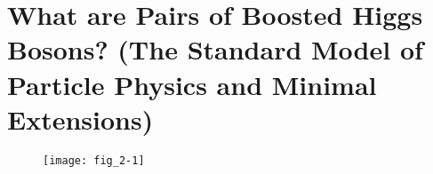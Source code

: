 \chapter{What are Pairs of Boosted Higgs Bosons? (The Standard Model of Particle Physics and Minimal Extensions)}
\label{chap:two}

\sect{\lipsum*[10][1]}

\subsect{\lipsum*[10][2]}

\lipsum[1-2]

\subsect{\lipsum*[10][3]}

\lipsum[3-5]

\subsect{\lipsum*[10][4]}

\lipsum[6-7]

\subsect{\lipsum*[10][5]}

\lipsum[9-10]

\subsect{\lipsum*[10][6]}

\lipsum[11-12]

\sect{\lipsum*[11][1]}

\subsect{\lipsum*[11][2]}

\lipsum[13]

\subsect{\lipsum*[11][3]}

\lipsum[13-15]

\subsect{\lipsum*[11][4]}

\lipsum[16-18]

\subsect{\lipsum*[11][5]}

\lipsum[19-20]

\subsect{\lipsum*[11][6]}

\lipsum[21]

\subsect{\lipsum*[11][7]}

\lipsum[22]

\subsect{\lipsum*[11][8]}

\lipsum[23]

\subsect{\lipsum*[11][9]}

\lipsum[24]

\subsect{\lipsum*[11][10]}

\lipsum[25-27]

\subsect{\lipsum*[11][11]}

\lipsum[28-30]

\sect{\lipsum*[12][1]}

\subsect{\lipsum*[12][2]}

\lipsum[31-37]

\begin{figure}[p] %
   \centering
   \texttt{[image: fig\_2-1]}
   \caption[{\lipsum*[21][1]}]{\lipsum*[21][1-5]}
   \label{fig:fig_2-1}
\end{figure}

